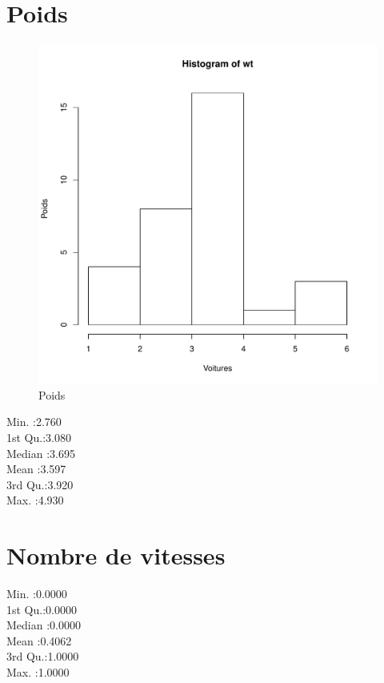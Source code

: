 \documentclass[a4]{article}
\begin{document}
\section{Poids}

\begin{figure}[h]
\includegraphics[scale=0.5]{graphicA.pdf}
\caption{Poids}
\end{figure}
       
Min.   :2.760\\ 
1st Qu.:3.080\\
Median :3.695\\  
Mean   :3.597\\ 
3rd Qu.:3.920\\
Max.   :4.930\\

\section{Nombre de vitesses}
 
 Min.   :0.0000\\
 1st Qu.:0.0000\\
 Median :0.0000\\
 Mean   :0.4062\\
 3rd Qu.:1.0000\\
 Max.   :1.0000\\
\end{document}
